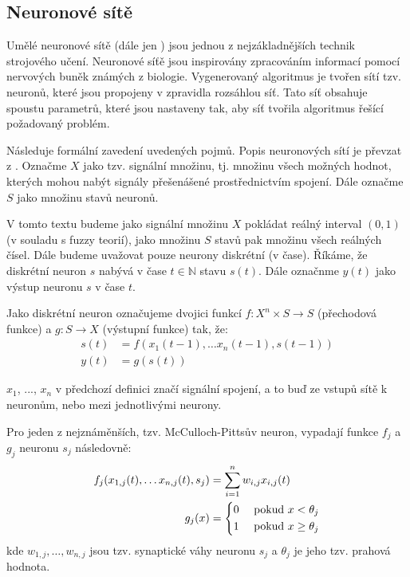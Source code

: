 \documentclass[a4paper,10pt]{article}
\begin{document}
\subsection{Neuronové sítě}
Umělé neuronové sítě (dále jen ) jsou jednou z nejzákladnějších technik strojového učení. Neuronové síťě jsou inspirovány zpracováním informací pomocí nervových buněk známých z biologie. Vygenerovaný algoritmus je tvořen sítí tzv. neuronů, které jsou propojeny v zpravidla rozsáhlou síť. Tato síť obsahuje spoustu parametrů, které jsou nastaveny tak, aby síť tvořila algoritmus řešící požadovaný problém. 

Následuje formální zavedení uvedených pojmů. Popis neuronových sítí je převzat z \cite{FieRus-HanNeuCom}. Označme $X$ jako tzv. signální množinu, tj. množinu všech možných hodnot, kterých mohou nabýt signály přešenášené prostřednictvím spojení. Dále označme $S$ jako množinu stavů neuronů. 

V tomto textu budeme jako signální množinu $X$ pokládat reálný interval $(0, 1)$ (v souladu s fuzzy teorií), jako množinu $S$ stavů pak množinu všech reálných čísel. Dále budeme uvažovat pouze neurony diskrétní (v čase). Říkáme, že diskrétní neuron $s$ nabývá v čase $t \in \mathbb{N}$ stavu $s(t)$. Dále označnme $y(t)$ jako výstup neuronu $s$ v čase $t$.

\begin{definition}
 Jako diskrétní neuron označujeme dvojici funkcí $f: X^n \times S \rightarrow S$ (přechodová funkce) a $g: S \rightarrow X$ (výstupní funkce) tak, že:
 \begin{align*}
  s(t) &= f(x_1(t - 1), \dots x_n(t - 1), s(t - 1)) \\
  y(t) &= g(s(t))
 \end{align*}
\end{definition}

\begin{note}
 $x_1$, ..., $x_n$ v předchozí definici značí signální spojení, a to buď ze vstupů sítě k neuronům, nebo mezi jednotlivými neurony.
\end{note}

\begin{example}
 Pro jeden z nejznáměnších, tzv. McCulloch-Pittsův neuron, vypadají funkce $f_j$ a $g_j$ neuronu $s_j$ následovně:
 \begin{align*}
  f_j(x_{1,j}(t), \dots x_{n,j}(t), s_j) &=  \sum_{i=1}^n w_{i,j} x_{i,j}(t) \\
  g_j(x) &= 
   \begin{dcases}
    0 & \text{ pokud $x < \theta_j$} \\
    1 & \text{ pokud $x \geq \theta_j$}
   \end{dcases}
 \end{align*}
 kde $w_{1,j}, \dots, w_{n,j}$ jsou tzv. synaptické váhy neuronu $s_j$ a $\theta_j$ je jeho tzv. prahová hodnota. 
\end{example}
\end{document}
